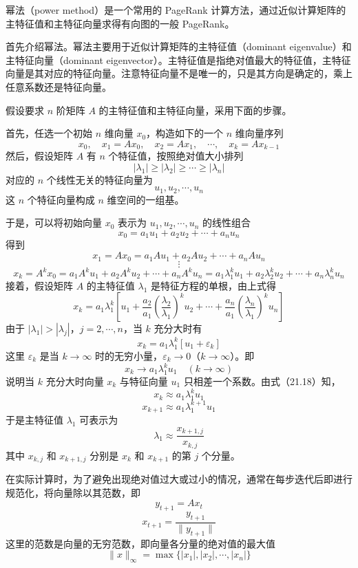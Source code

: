 \documentclass[UTF8, 12pt, fontset=fandol, oneside]{ctexart}
\begin{document}
幂法（power method）是一个常用的 PageRank 计算方法，通过近似计算矩阵的主特征值和主特征向量求得有向图的一般 PageRank。

首先介绍幂法。幂法主要用于近似计算矩阵的主特征值（dominant eigenvalue）和主特征向量（dominant eigenvector）。主特征值是指绝对值最大的特征值，主特征向量是其对应的特征向量。注意特征向量不是唯一的，只是其方向是确定的，乘上任意系数还是特征向量。

假设要求 $n$ 阶矩阵 $A$ 的主特征值和主特征向量，采用下面的步骤。

首先，任选一个初始 $n$ 维向量 $x_0$，构造如下的一个 $n$ 维向量序列
\[
x_0,\quad x_1=Ax_0,\quad x_2=Ax_1,\quad \cdots,\quad x_k=Ax_{k-1}
\]
然后，假设矩阵 $A$ 有 $n$ 个特征值，按照绝对值大小排列
\[
|\lambda_1|\geqslant |\lambda_2|\geqslant \cdots \geqslant |\lambda_n|
\]
对应的 $n$ 个线性无关的特征向量为
\[
u_1,u_2,\cdots,u_n
\]
这 $n$ 个特征向量构成 $n$ 维空间的一组基。

于是，可以将初始向量 $x_0$ 表示为 $u_1,u_2,\cdots,u_n$ 的线性组合
\[
x_0=a_1u_1+a_2u_2+\cdots+a_nu_n
\]
得到
\[
x_1=Ax_0=a_1Au_1+a_2Au_2+\cdots+a_nAu_n
\]
\[
\vdots
\]
\[
x_k=A^kx_0=a_1A^ku_1+a_2A^ku_2+\cdots+a_nA^ku_n
=a_1\lambda_1^ku_1+a_2\lambda_2^ku_2+\cdots+a_n\lambda_n^ku_n
\]
接着，假设矩阵 $A$ 的主特征值 $\lambda_1$ 是特征方程的单根，由上式得
\begin{equation}
x_k=a_1\lambda_1^k\left[u_1+\frac{a_2}{a_1}\left(\frac{\lambda_2}{\lambda_1}\right)^ku_2+\cdots+\frac{a_n}{a_1}\left(\frac{\lambda_n}{\lambda_1}\right)^ku_n\right]
\tag{21.16}
\end{equation}
由于 $|\lambda_1|>|\lambda_j|$，$j=2,\cdots,n$，当 $k$ 充分大时有
\begin{equation}
x_k=a_1\lambda_1^k[u_1+\varepsilon_k]
\tag{21.17}
\end{equation}
这里 $\varepsilon_k$ 是当 $k\to\infty$ 时的无穷小量，$\varepsilon_k\to 0$（$k\to\infty$）。即
\begin{equation}
x_k\to a_1\lambda_1^ku_1\quad (k\to\infty)
\tag{21.18}
\end{equation}
说明当 $k$ 充分大时向量 $x_k$ 与特征向量 $u_1$ 只相差一个系数。由式（21.18）知，
\[
x_k\approx a_1\lambda_1^ku_1
\]
\[
x_{k+1}\approx a_1\lambda_1^{k+1}u_1
\]
于是主特征值 $\lambda_1$ 可表示为
\begin{equation}
\lambda_1\approx \frac{x_{k+1,j}}{x_{k,j}}
\tag{21.19}
\end{equation}
其中 $x_{k,j}$ 和 $x_{k+1,j}$ 分别是 $x_k$ 和 $x_{k+1}$ 的第 $j$ 个分量。

在实际计算时，为了避免出现绝对值过大或过小的情况，通常在每步迭代后即进行规范化，将向量除以其范数，即
\begin{equation}
y_{t+1}=Ax_t
\tag{21.20}
\end{equation}
\begin{equation}
x_{t+1}=\frac{y_{t+1}}{\|y_{t+1}\|}
\tag{21.21}
\end{equation}
这里的范数是向量的无穷范数，即向量各分量的绝对值的最大值
\[
\|x\|_\infty=\max\{|x_1|,|x_2|,\cdots,|x_n|\}
\]
\end{document}
